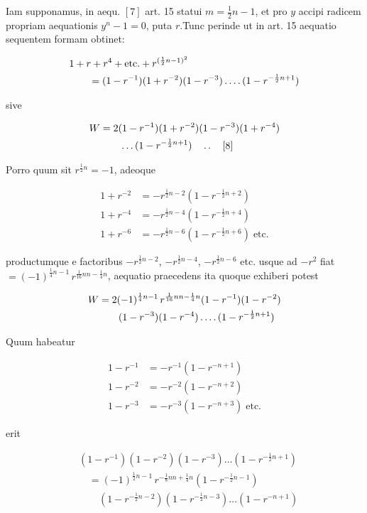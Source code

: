 Iam supponamus, in aequ. $[7]$ art. 15 statui $m=\frac12n-1$, et pro $y$ accipi radicem propriam aequationis $y^n-1=0$, puta $r$.\quad Tunc perinde ut in art. 15 aequatio sequentem formam obtinet:

\[
\begin{aligned}
&1+r+r^4+\text{etc.}+r^{(\frac12n-1)^2}\\&\qquad=(1-r^{-1})(1+r^{-2})(1-r^{-3})\mathinner{.\,.\,.\,.}(1-r^{-\frac12n+1})
\end{aligned}
\]

%
sive

\[
\begin{aligned}
W&=2(1-r^{-1})(1+r^{-2})(1-r^{-3})(1+r^{-4})\\&\qquad\ldots(1-r^{-\frac12n+1})\quad\mathinner{.\,.}\quad[8]
\end{aligned}
\]

Porro quum sit $r^{\frac12n}=-1$, adeoque

\[
\begin{aligned}
1+r^{-2}&=-r^{\frac12n-2}(1-r^{-\frac12n+2})\\
1+r^{-4}&=-r^{\frac12n-4}(1-r^{-\frac12n+4})\\
1+r^{-6}&=-r^{\frac12n-6}(1-r^{-\frac12n+6})\;\text{etc.}
\end{aligned}
\]

productumque e factoribus $-r^{\frac12n-2}$, $-r^{\frac12n-4}$, $-r^{\frac12n-6}$ etc. usque ad $-r^2$ fiat $=(-1)^{\frac14n-1}\,r^{\frac1{16}nn-\frac14n}$, aequatio praecedens ita quoque exhiberi potest

\[
\begin{aligned}
W&=2(-1)^{\frac14n-1}\,r^{\frac1{16}nn-\frac14n}(1-r^{-1})(1-r^{-2})\\&\qquad(1-r^{-3})(1-r^{-4})\mathinner{.\,.\,.\,.}(1-r^{-\frac12n+1})
\end{aligned}
\]

Quum habeatur

\[
\begin{aligned}
1-r^{-1}&=-r^{-1}(1-r^{-n+1})\\
1-r^{-2}&=-r^{-2}(1-r^{-n+2})\\
1-r^{-3}&=-r^{-3}(1-r^{-n+3})\;\text{etc.}
\end{aligned}
\]

erit

\[
\begin{aligned}
&(1-r^{-1})(1-r^{-2})(1-r^{-3})\ldots(1-r^{-\frac12n+1})\\
&\quad=(-1)^{\frac12n-1}\,r^{-\frac18nn+\frac14n}(1-r^{-\frac12n-1})\\&\qquad(1-r^{-\frac12n-2})(1-r^{-\frac12n-3})\ldots(1-r^{-n+1})
\end{aligned}
\]

